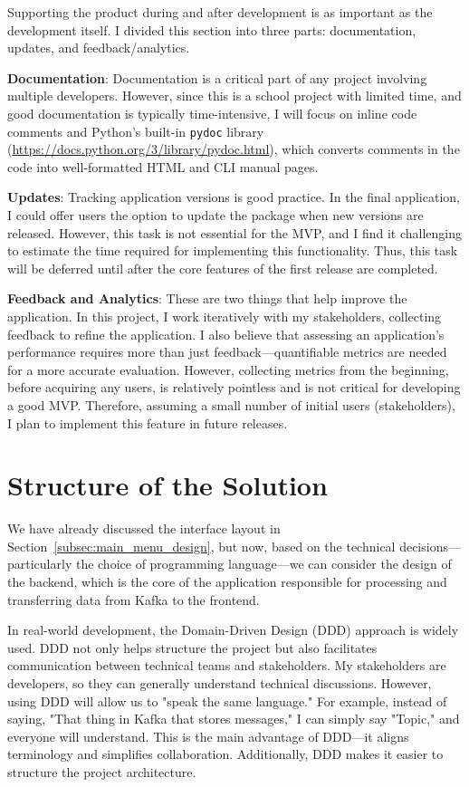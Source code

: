\documentclass[10pt , a4paper]{report}
\begin{document}
Supporting the product during and after development is as important as the development itself. I divided this section into three parts: documentation, updates, and feedback/analytics.

\textbf{Documentation}: Documentation is a critical part of any project involving multiple developers. However, since this is a school project with limited time, and good documentation is typically time-intensive, I will focus on inline code comments and Python's built-in \texttt{pydoc} library (\url{https://docs.python.org/3/library/pydoc.html}), which converts comments in the code into well-formatted HTML and CLI manual pages.

\textbf{Updates}: Tracking application versions is good practice. In the final application, I could offer users the option to update the package when new versions are released. However, this task is not essential for the MVP, and I find it challenging to estimate the time required for implementing this functionality. Thus, this task will be deferred until after the core features of the first release are completed.

\textbf{Feedback and Analytics}: These are two things that help improve the application. In this project, I work iteratively with my stakeholders, collecting feedback to refine the application. I also believe that assessing an application's performance requires more than just feedback—quantifiable metrics are needed for a more accurate evaluation. However, collecting metrics from the beginning, before acquiring any users, is relatively pointless and is not critical for developing a good MVP. Therefore, assuming a small number of initial users (stakeholders), I plan to implement this feature in future releases.

\section{Structure of the Solution}

We have already discussed the interface layout in Section~\ref{subsec:main_menu_design}, but now, based on the technical decisions—particularly the choice of programming language—we can consider the design of the backend, which is the core of the application responsible for processing and transferring data from Kafka to the frontend.

In real-world development, the Domain-Driven Design (DDD) approach is widely used. DDD not only helps structure the project but also facilitates communication between technical teams and stakeholders. My stakeholders are developers, so they can generally understand technical discussions. However, using DDD will allow us to "speak the same language." For example, instead of saying, "That thing in Kafka that stores messages," I can simply say "Topic," and everyone will understand. This is the main advantage of DDD—it aligns terminology and simplifies collaboration. Additionally, DDD makes it easier to structure the project architecture.
\end{document}
